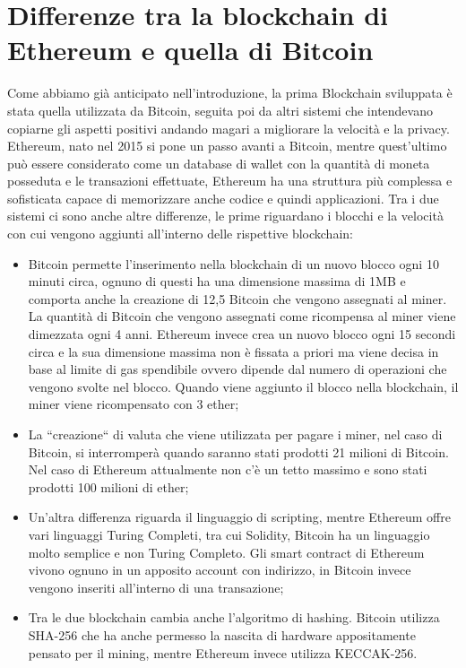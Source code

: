\documentclass[12pt]{report}
\begin{document}
\section{Differenze tra la blockchain di Ethereum e quella di Bitcoin}

Come abbiamo già anticipato nell'introduzione, la prima Blockchain sviluppata è stata quella utilizzata da Bitcoin, seguita poi da altri sistemi che intendevano copiarne gli aspetti positivi andando magari a migliorare la velocità e la privacy.
\newline Ethereum, nato nel 2015 si pone un passo avanti a Bitcoin, mentre quest'ultimo può essere considerato come un database di wallet con la quantità di moneta posseduta e le transazioni effettuate, Ethereum ha una struttura più complessa e sofisticata capace di memorizzare anche codice e quindi applicazioni.
Tra i due sistemi ci sono anche altre differenze, le prime riguardano i blocchi e la velocità con cui vengono aggiunti all'interno delle rispettive blockchain:

\begin{itemize}
\item Bitcoin permette l'inserimento nella blockchain di un nuovo blocco ogni 10 minuti circa, ognuno di questi ha una dimensione massima di 1MB e comporta anche la creazione di 12,5 Bitcoin che vengono assegnati al miner. La quantità di Bitcoin che vengono assegnati come ricompensa al miner viene dimezzata ogni 4 anni.
Ethereum invece crea un nuovo blocco ogni 15 secondi circa e la sua dimensione massima non è fissata a priori ma viene decisa in base al limite di gas spendibile ovvero dipende dal numero di operazioni che vengono svolte nel blocco. Quando viene aggiunto il blocco nella blockchain, il miner viene ricompensato con 3 ether;
\item La ``creazione`` di valuta che viene utilizzata per pagare i miner, nel caso di Bitcoin, si interromperà quando saranno stati prodotti 21 milioni di Bitcoin. Nel caso di Ethereum attualmente non c'è un tetto massimo e sono stati prodotti 100 milioni di ether;
\item Un'altra differenza riguarda il linguaggio di scripting, mentre Ethereum offre vari linguaggi Turing Completi, tra cui Solidity, Bitcoin ha un linguaggio molto semplice e non Turing Completo.
Gli smart contract di Ethereum vivono ognuno in un apposito account con indirizzo, in Bitcoin invece vengono inseriti all'interno di una transazione;
\item Tra le due blockchain cambia anche l'algoritmo di hashing.
Bitcoin utilizza SHA-256 che ha anche permesso la nascita di hardware appositamente pensato per il mining, mentre Ethereum invece utilizza KECCAK-256.
\end{itemize}
\end{document}
